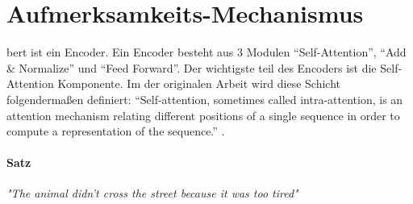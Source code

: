 \documentclass[
        ngerman,
        paper=a4,
        numbers=noendperiod,
]{scrreprt}
\begin{document}



\section{Aufmerksamkeits-Mechanismus}
\ac{bert} ist ein Encoder. Ein Encoder besteht aus 3 Modulen \enquote{Self-Attention}, \enquote{Add & Normalize} und \enquote{Feed Forward}. Der wichtigste teil des Encoders ist die Self-Attention Komponente. Im der originalen Arbeit \citep{VaswaniAttentionNeed} wird diese Schicht folgendermaßen definiert: \enquote{Self-attention, sometimes called intra-attention, is an attention mechanism relating different positions of a single sequence in order to compute a representation of the sequence.} \citep{VaswaniAttentionNeed}.


\paragraph{Satz}\textit{"The animal didn't cross the street because it was too tired"}
\newline
    
\end{document}
